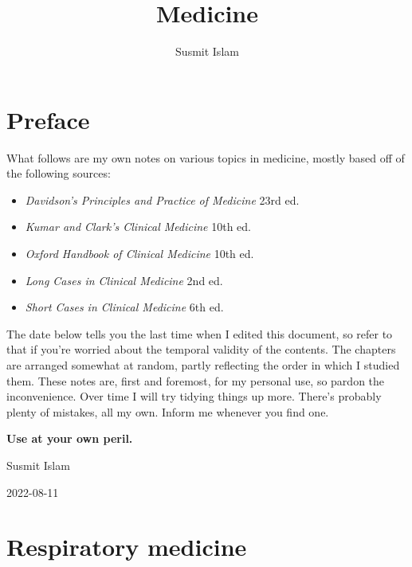 \documentclass[
  12pt,
]{memoir}
\title{Medicine}
\author{Susmit Islam}
\date{}
\providecommand{\tightlist}{%
  \setlength{\itemsep}{0pt}\setlength{\parskip}{0pt}}
\begin{document}
\frontmatter

\maketitle

\mainmatter
\renewcommand{\labelitemi}{$\blacktriangleright$}
\renewcommand{\labelitemii}{$\boldsymbol\circ$}
\renewcommand{\labelitemiii}{$\bullet$}
\renewcommand{\labelitemiv}{\tiny$\blacksquare$}

\openany
\raggedbottom
\twocoltocetc
\tableofcontents

\pagebreak

\hypertarget{preface}{%
\chapter*{Preface}\label{preface}}

What follows are my own notes on various topics in medicine, mostly
based off of the following sources:

\begin{itemize}
\tightlist
\item
  \emph{Davidson's Principles and Practice of Medicine} 23rd ed.
\item
  \emph{Kumar and Clark's Clinical Medicine} 10th ed.
\item
  \emph{Oxford Handbook of Clinical Medicine} 10th ed.
\item
  \emph{Long Cases in Clinical Medicine} 2nd ed.
\item
  \emph{Short Cases in Clinical Medicine} 6th ed.
\end{itemize}

The date below tells you the last time when I edited this document, so
refer to that if you're worried about the temporal validity of the
contents. The chapters are arranged somewhat at random, partly
reflecting the order in which I studied them. These notes are, first and
foremost, for my personal use, so pardon the inconvenience. Over time I
will try tidying things up more. There's probably plenty of mistakes,
all my own. Inform me whenever you find one.\newline

\textbf{Use at your own peril.}

\hfill Susmit Islam

\hfill 2022-08-11

\hypertarget{respiratory-medicine}{%
\chapter{Respiratory medicine}\label{respiratory-medicine}}
\end{document}

